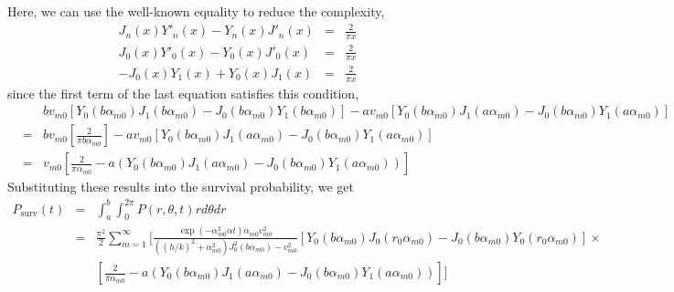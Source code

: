 \documentclass{article}
\begin{document}
%
Here, we can use the well-known equality to reduce the complexity,
%
\begin{eqnarray}
    J_n(x)Y'_n(x) - Y_n(x)J'_n(x) &=& \frac{2}{\pi x} \\
    J_0(x)Y'_0(x) - Y_0(x)J'_0(x) &=& \frac{2}{\pi x} \nonumber\\
    -J_0(x)Y_1(x) + Y_0(x)J_1(x)  &=& \frac{2}{\pi x} \nonumber
\end{eqnarray}
%
since the first term of the last equation satisfies this condition,
%
\begin{eqnarray}
    & & bv_{m0}\left[Y_0(b\alpha_{m0})J_1(b\alpha_{m0}) - J_0(b\alpha_{m0})Y_1(b\alpha_{m0})\right] -
        av_{m0}\left[Y_0(b\alpha_{m0})J_1(a\alpha_{m0}) - J_0(b\alpha_{m0})Y_1(a\alpha_{m0})\right]
\nonumber\\
    &=& bv_{m0}\left[\frac{2}{\pi b\alpha_{m0}}\right] -
        av_{m0}\left[Y_0(b\alpha_{m0})J_1(a\alpha_{m0}) - J_0(b\alpha_{m0})Y_1(a\alpha_{m0})\right]
\nonumber\\
    &=& v_{m0}\left[\frac{2}{\pi\alpha_{m0}} - a\left(Y_0(b\alpha_{m0})J_1(a\alpha_{m0}) - J_0(b\alpha_{m0})Y_1(a\alpha_{m0})\right)\right]
\end{eqnarray}
%
Substituting these results into the survival probability, we get
%
\begin{eqnarray}
    P_{\mathrm{surv}}(t) &=& \int_a^b \int_0^{2\pi} P(r, \theta, t) rd\theta dr
\nonumber\\
    &=& \frac{\pi^2}{2} \sum_{m=1}^{\infty} \Bigg[
        \frac{\exp(-\alpha_{m0}^2\alpha t)\alpha_{m0}v_{m0}^2}
             {((h/k)^2 + \alpha_{m0}^2)J_0^2(b\alpha_{m0})-v_{m0}^2}
        \left[Y_0(b\alpha_{m0})J_0(r_0\alpha_{m0}) - J_0(b\alpha_{m0})Y_0(r_0\alpha_{m0})\right] \times
\nonumber\\
    & & \left[\frac{2}{\pi\alpha_{m0}} -
        a\left(Y_0(b\alpha_{m0})J_1(a\alpha_{m0}) - J_0(b\alpha_{m0})Y_1(a\alpha_{m0})\right)\right]
        \Bigg]
\nonumber
\end{eqnarray}
\end{document}
